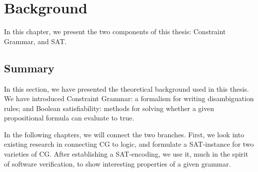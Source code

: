 \chapter{Background}

In this chapter, we present the two components of this thesis: Constraint Grammar, and SAT.






\section{Summary}

In this section, we have presented the theoretical background used in this thesis. 
We have introduced Constraint Grammar: a formalism for writing disambiguation rules; and Boolean satisfiability: methods for solving whether a given propositional formula can evaluate to true.

In the following chapters, we will connect the two branches. First, we look into existing research in connecting CG to logic, and formulate a SAT-instance for two varieties of CG. After establishing a SAT-encoding, we use it, much in the spirit of software verification, to show interesting properties of a given grammar. 



 






